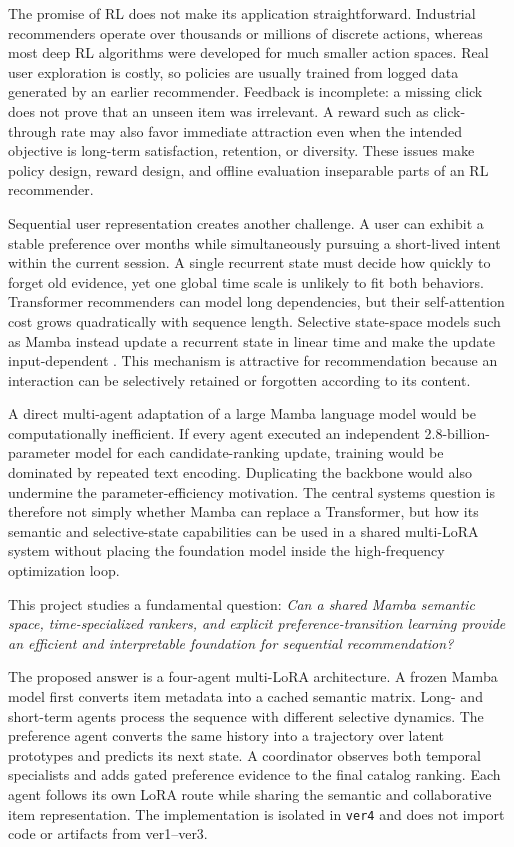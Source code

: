 \documentclass[11pt,a4paper]{article}
\begin{document}
The promise of RL does not make its application straightforward. Industrial recommenders operate over thousands or millions of discrete actions, whereas most deep RL algorithms were developed for much smaller action spaces. Real user exploration is costly, so policies are usually trained from logged data generated by an earlier recommender. Feedback is incomplete: a missing click does not prove that an unseen item was irrelevant. A reward such as click-through rate may also favor immediate attraction even when the intended objective is long-term satisfaction, retention, or diversity. These issues make policy design, reward design, and offline evaluation inseparable parts of an RL recommender.

Sequential user representation creates another challenge. A user can exhibit a stable preference over months while simultaneously pursuing a short-lived intent within the current session. A single recurrent state must decide how quickly to forget old evidence, yet one global time scale is unlikely to fit both behaviors. Transformer recommenders can model long dependencies, but their self-attention cost grows quadratically with sequence length. Selective state-space models such as Mamba instead update a recurrent state in linear time and make the update input-dependent \cite{MAMBA}. This mechanism is attractive for recommendation because an interaction can be selectively retained or forgotten according to its content.

A direct multi-agent adaptation of a large Mamba language model would be computationally inefficient. If every agent executed an independent 2.8-billion-parameter model for each candidate-ranking update, training would be dominated by repeated text encoding. Duplicating the backbone would also undermine the parameter-efficiency motivation. The central systems question is therefore not simply whether Mamba can replace a Transformer, but how its semantic and selective-state capabilities can be used in a shared multi-LoRA system without placing the foundation model inside the high-frequency optimization loop.

This project studies a fundamental question: \emph{Can a shared Mamba semantic
space, time-specialized rankers, and explicit preference-transition learning
provide an efficient and interpretable foundation for sequential recommendation?}

The proposed answer is a four-agent multi-LoRA architecture. A frozen Mamba model first converts item metadata into a cached semantic matrix. Long- and short-term agents process the sequence with different selective dynamics. The preference agent converts the same history into a trajectory over latent prototypes and predicts its next state. A coordinator observes both temporal specialists and adds gated preference evidence to the final catalog ranking. Each agent follows its own LoRA route while sharing the semantic and collaborative item representation. The implementation is isolated in \texttt{ver4} and does not import code or artifacts from ver1--ver3.
\end{document}
